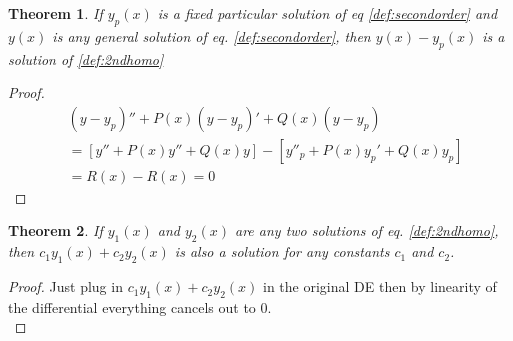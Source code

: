 \documentclass[oneside,11pt,pdftex,final]{book}%
\numberwithin{equation}{section}
\newtheorem{theorem}{Theorem}[chapter]%
\numberwithin{section}{chapter}
\numberwithin{equation}{chapter}
\begin{document}
\begin{theorem}
	If $ y_p(x) $ is a fixed particular solution of eq \ref{def:secondorder} and $ y(x) $ is any general solution of eq. \ref{def:secondorder}, then $ y(x) -y_p(x)$ is a solution of \ref{def:2ndhomo}
\end{theorem}
\begin{proof}
	\begin{align*}
		&(y-y_p)''+P(x)(y-y_p)'+Q(x)(y-y_p)\\
		&=[y''+P(x)y''+Q(x)y]-[y''_p+P(x)y_p'+Q(x)y_p]\\
		&=R(x)-R(x)=0
	\end{align*}
\end{proof}

\begin{theorem}\label{combosoln}
	If $ y_1(x) $ and $ y_2(x) $ are any two solutions of eq. \ref{def:2ndhomo}, then $ c_1y_1(x) +c_2 y_2 (x)$ is also a solution for any constants $ c_1 $ and $ c_2 $.
\end{theorem}
\begin{proof}
	Just plug in $ c_1y_1(x)+c_2y_2(x) $ in the original DE then by linearity of the differential everything cancels out to 0.\\
\end{proof}
\end{document}

